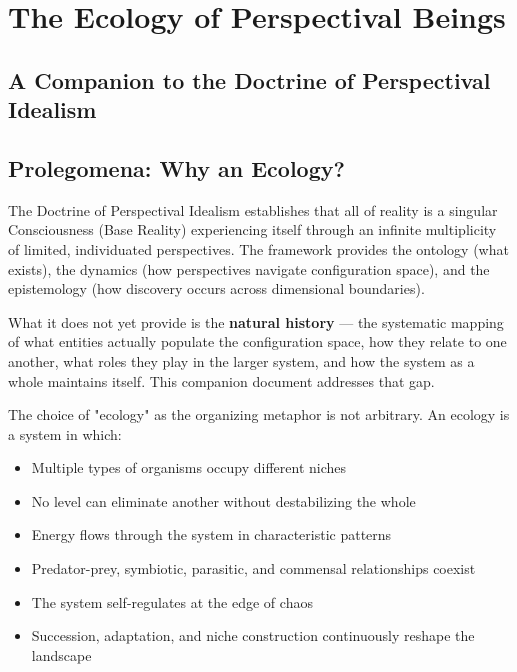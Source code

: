 \chapter*{The Ecology of Perspectival Beings}


\section*{A Companion to the Doctrine of Perspectival Idealism}




\bigskip\noindent\makebox[\textwidth]{\color{rulegray}\rule{5cm}{0.3pt}}\bigskip


\section*{Prolegomena: Why an Ecology?}


The Doctrine of Perspectival Idealism establishes that all of reality is a singular Consciousness (Base Reality) experiencing itself through an infinite multiplicity of limited, individuated perspectives. The framework provides the ontology (what exists), the dynamics (how perspectives navigate configuration space), and the epistemology (how discovery occurs across dimensional boundaries).


What it does not yet provide is the \textbf{natural history} — the systematic mapping of what entities actually populate the configuration space, how they relate to one another, what roles they play in the larger system, and how the system as a whole maintains itself. This companion document addresses that gap.


The choice of "ecology" as the organizing metaphor is not arbitrary. An ecology is a system in which:


\begin{itemize}[nosep,leftmargin=*]
  \item Multiple types of organisms occupy different niches
  \item No level can eliminate another without destabilizing the whole
  \item Energy flows through the system in characteristic patterns
  \item Predator-prey, symbiotic, parasitic, and commensal relationships coexist
  \item The system self-regulates at the edge of chaos
  \item Succession, adaptation, and niche construction continuously reshape the landscape
\end{itemize}


